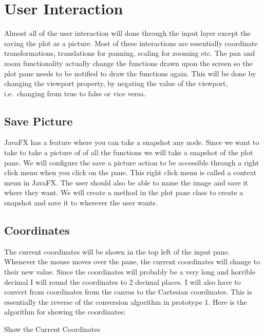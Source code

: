 \documentclass[../../../../main.tex]{subfiles}
\begin{document}
\section{User Interaction}
Almost all of the user interaction will done through the input layer except the saving the plot as a picture. Most of these interactions are essentially coordinate transformations, translations for panning, scaling for zooming etc. The pan and zoom functionality actually change the functions drawn upon the screen so the plot pane needs to be notified to draw the functions again. This will be done by changing the viewport property, by negating the value of the viewport, i.e.\ changing from true to false or vice versa.
\subsection{Save Picture}
JavaFX has a feature where you can take a snapshot\cite{snapshotJava} any node. Since we want to take to take a picture of of all the functions we will take a snapshot of the plot pane. We will configure the save a picture action to be accessible through a right click menu when you click on the pane. This right click menu is called a context menu\cite{contextJava} in JavaFX. The user should also be able to name the image and save it where they want. We will create a method in the plot pane class to create a snapshot and save it to wherever the user wants.
\newpage
\subsection{Coordinates}
The current coordinates will be shown in the top left of the input pane. Whenever the mouse moves over the pane, the current coordinates will change to their new value. Since the coordinates will probably be a very long and horrible decimal I will round the coordinates to 2 decimal places. I will also have to convert from coordinates from the canvas to the Cartesian coordinates. This is essentially the reverse of the conversion algorithm in prototype 1.  Here is the algorithm for showing the coordinates:
\begin{algorithm}[H]
\DontPrintSemicolon
\caption{Show the Current Coordinates}
\end{algorithm}
\end{document}
